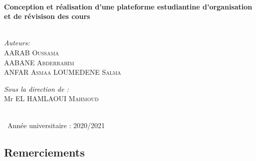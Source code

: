 \documentclass{article}
\begin{document}
\begin{titlepage}
\HRule \\[0.4cm]
{ \huge \bfseries Conception et réalisation d'une plateforme estudiantine d'organisation et de révisison des cours}\\[0.4cm] %
\HRule \\[0.3cm]
 
\vspace{1.8cm}
\begin{minipage}{0.4\textwidth}
\begin{flushleft} \large
\emph{Auteurs:}\\
   AARAB\textsc{	Oussama} \\
   AABANE\textsc{	Abderrahim} \\
   ANFAR\textsc{	Asmaa}
   LOUMEDENE\textsc{	Salma}\\
\emph{}

\end{flushleft}
\end{minipage}
\begin{minipage}{0.5\textwidth}
\begin{flushright} \large
\emph{Sous la direction de :} \\
Mr EL HAMLAOUI  \textsc{Mahmoud} 
\end{flushright}
\end{minipage}\\[3cm]

{\large \  Année universitaire : 2020/2021}\\[0.5cm] %

\vfill %

\end{titlepage}
\begin{center}
\centering
    \hspace{4cm}\section*{Remerciements}
\end{center}
\end{document}
